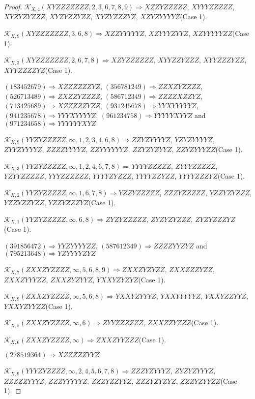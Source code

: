\documentclass[12pt]{article}
\theoremstyle{plain}
\theoremstyle{definition}
\theoremstyle{remark}
\newcommand{\fancy}[1]{\mathcal{#1}}
\def\K{\fancy{K}}
\begin{document}
\begin{proof}
	
	$\K_{X,4}(XYZZZZZZZ,2, 3, 6, 7, 8, 9)\Rightarrow $$XZZYZZZZZ$, $XYYYZZZZZ$, $XYZYZYZZZ$, $XYZYZZYZZ$, $XYZYZZZYZ$, $XZYZYYYYZ$(Case 1).
	
	$\K_{X,9}(XYZZZZZZZ,3, 6, 8)\Rightarrow $$XZZYYYYYZ$, $XZYYYZYYZ$, $XZYYYYYZZ$(Case 1).
	
	$\K_{X,3}(XYZZZZZZZ,2, 6, 7, 8)\Rightarrow $$XZYZZZZZZ$, $XYYZZYZZZ$, $XYYZZZYZZ$, $XYYZZZZYZ$(Case 1).
	
	
	
	$(1 8 3 4 5 2 6 7 9)\Rightarrow XZZZZZZYZ$, $(3 5 6 7 8 1 2 4 9)\Rightarrow ZZXZYZZZZ$, $(5 2 6 7 1 3 4 8 9)\Rightarrow ZXZZYZZZZ$, $(5 8 6 7 1 2 3 4 9)\Rightarrow ZZZZXZZYZ$, $(7 1 3 4 2 5 6 8 9)\Rightarrow XZZZZZYZZ$, $(9 3 1 2 4 5 6 7 8)\Rightarrow YYXYYYYYZ$, $(9 4 1 2 3 5 6 7 8)\Rightarrow YYYXYYYYZ$, $(9 6 1 2 3 4 7 5 8)\Rightarrow YYYYYXYYZ$ and $(9 7 1 2 3 4 6 5 8)\Rightarrow YYYYYYXYZ$
	
	
	$\K_{X,9}(YYZYZZZZZ,\infty,1, 2, 3, 4, 6, 8)\Rightarrow $$ZZYZYYYYZ$, $YZYZYYYYZ$, $ZYYZYYYYZ$, $ZZZZYYYYZ$, $ZZYYYYYYZ$, $ZZYZYZYYZ$, $ZZYZYYYZZ$(Case 1).
	
	$\K_{X,3}(YYZYZZZZZ,\infty,1, 2, 4, 6, 7, 8)\Rightarrow $$YYYYZZZZZ$, $ZYYYZZZZZ$, $YZYYZZZZZ$, $YYYZZZZZZ$, $YYYYZYZZZ$, $YYYYZZYZZ$, $YYYYZZZYZ$(Case 1).
	
	$\K_{X,2}(YYZYZZZZZ,\infty,1, 6, 7, 8)\Rightarrow $$YZZYZZZZZ$, $ZZZYZZZZZ$, $YZZYZYZZZ$, $YZZYZZYZZ$, $YZZYZZZYZ$(Case 1).
	
	$\K_{X,1}(YYZYZZZZZ,\infty,6, 8)\Rightarrow $$ZYZYZZZZZ$, $ZYZYZYZZZ$, $ZYZYZZZYZ$(Case 1).
	
	
	
	$(3 9 1 8 5 6 4 7 2)\Rightarrow YYZYYYYZZ$, $(5 8 7 6 1 2 3 4 9)\Rightarrow ZZZZYYZYZ$ and $(7 9 5 2 1 3 6 4 8)\Rightarrow YZYYYYZYZ$
	
	
	$\K_{X,7}(ZXXZYZZZZ,\infty,5, 6, 8, 9)\Rightarrow $$ZXXZYZYZZ$, $ZXXZZZYZZ$, $ZXXZYYYZZ$, $ZXXZYZYYZ$, $YXXYZYZYZ$(Case 1).
	
	$\K_{X,9}(ZXXZYZZZZ,\infty,5, 6, 8)\Rightarrow $$YXXYZYYYZ$, $YXXYYYYYZ$, $YXXYZZYYZ$, $YXXYZYYZZ$(Case 1).
	
	$\K_{X,5}(ZXXZYZZZZ,\infty,6)\Rightarrow $$ZYYZZZZZZ$, $ZXXZZYZZZ$(Case 1).
	
	$\K_{X,6}(ZXXZYZZZZ,\infty)\Rightarrow $$ZXXZYYZZZ$(Case 1).
	
	
	
	$(2 7 8 5 1 9 3 6 4)\Rightarrow XZZZZZYYZ$
	
	
	$\K_{X,9}(YYYZYZZZZ,\infty,2, 4, 5, 6, 7, 8)\Rightarrow $$ZZZYZYYYZ$, $ZYZYZYYYZ$, $ZZZZZYYYZ$, $ZZZYYYYYZ$, $ZZZYZZYYZ$, $ZZZYZYZYZ$, $ZZZYZYYZZ$(Case 1).
	

\end{proof}
\end{document}
